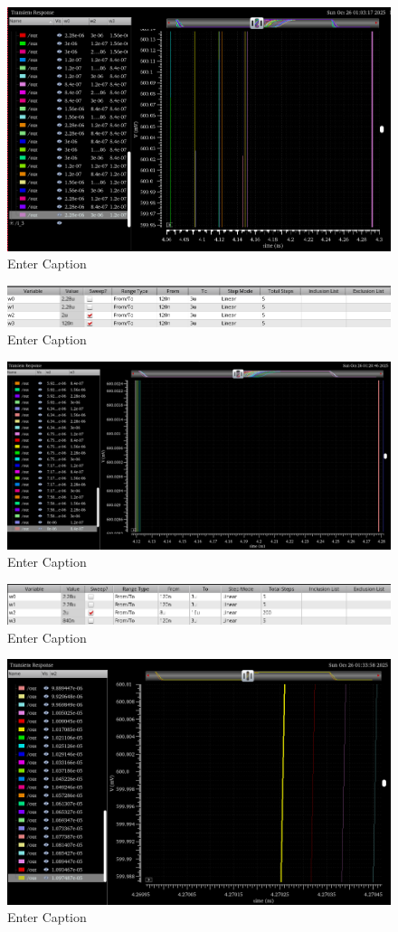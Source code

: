 \documentclass[12pt]{article}
\begin{document}
\begin{figure}[H]
    \centering
    \includegraphics[width=0.5\linewidth]{writeup//figures/wmux_3_parametrics_weep.png}
    \caption{Enter Caption}
\end{figure}

\begin{figure}[H]
    \centering
    \includegraphics[width=0.5\linewidth]{writeup//figures/wmux_2_parametric_sweep_setup.png}
    \caption{Enter Caption}
\end{figure}

\begin{figure}[H]
    \centering
    \includegraphics[width=0.5\linewidth]{writeup//figures/wmux_2_parametrics_weep.png}
    \caption{Enter Caption}
\end{figure}

\begin{figure}[H]
    \centering
    \includegraphics[width=0.5\linewidth]{writeup//figures/wmux_1_parametric_sweep_setup.png}
    \caption{Enter Caption}
\end{figure}

\begin{figure}[H]
    \centering
    \includegraphics[width=0.5\linewidth]{writeup//figures/wmux_1_parametrics_weep.png}
    \caption{Enter Caption}
\end{figure}
\end{document}
